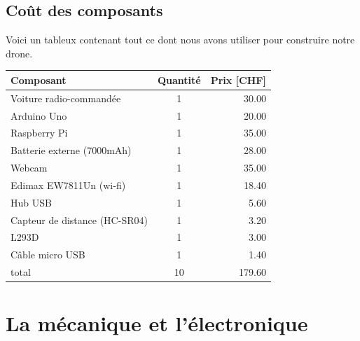 \documentclass[a4paper,12pt]{report}
\begin{document}
{\section{Coût des composants}
Voici un tableux contenant tout ce dont nous avons utiliser pour construire notre drone.
\begin{table}
\begin{tabular}{| l | c | r |}
\hline
Composant & Quantité & Prix [CHF] \\
\hline
Voiture radio-commandée & 1 & 30.00\\
\hline
Arduino Uno & 1 & 20.00 \\
\hline
Raspberry Pi& 1 & 35.00 \\
\hline
Batterie externe (7000mAh) &1 & 28.00 \\
\hline
Webcam & 1 & 35.00\\
\hline
Edimax EW7811Un (wi-fi) & 1 & 18.40\\
\hline
Hub USB & 1 & 5.60\\
\hline
Capteur de distance (HC-SR04) & 1 & 3.20\\
\hline
L293D & 1 & 3.00\\
\hline
Câble micro USB & 1 & 1.40\\
\hline


\hline
\hline
total & 10 & 179.60\\
\hline

\end{tabular}
\end{table}
\chapter{La mécanique et l'électronique}


}
\end{document}
